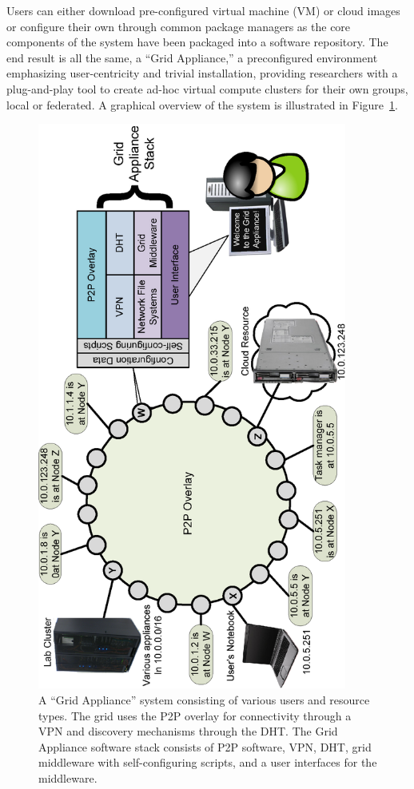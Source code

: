 \documentclass[conference]{IEEEtran}
\begin{document}
Users can either download pre-configured virtual machine (VM) or cloud images
or configure their own through common package managers as the core components
of the system have been packaged into a software repository.  The end result is
all the same, a ``Grid Appliance,'' a preconfigured environment emphasizing
user-centricity and trivial installation, providing researchers with a
plug-and-play tool to create ad-hoc virtual compute clusters for their own
groups, local or federated.  A graphical overview of the system is illustrated
in Figure~\ref{fig:appliance}.

\begin{figure}[ht]
\centering
\includegraphics[width=4in,angle=-90]{figs/appliance_overlays.eps}
\caption{A ``Grid Appliance'' system consisting of various users and resource
types.  The grid uses the P2P overlay for connectivity through a VPN and
discovery mechanisms through the DHT.  The Grid Appliance software stack
consists of P2P software, VPN, DHT, grid middleware with self-configuring
scripts, and a user interfaces for the middleware.}
\label{fig:appliance}
\end{figure}
\end{document}
